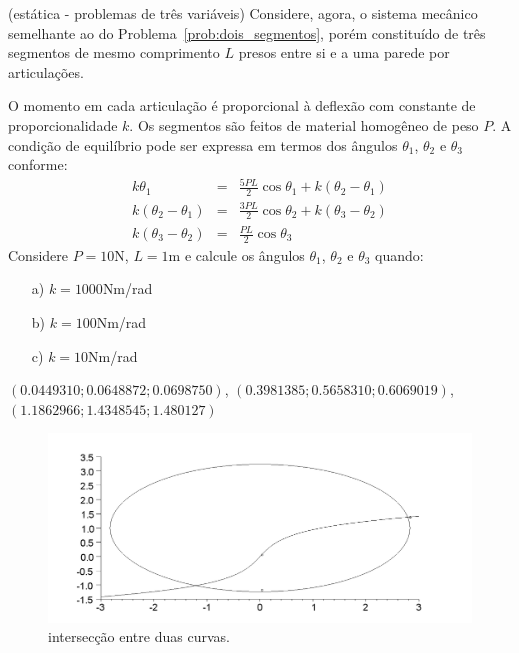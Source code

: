 \begin{exer}{(estática - problemas de três variáveis)} Considere, agora, o sistema mecânico semelhante ao do Problema~\ref{prob:dois_segmentos}, porém constituído de três segmentos de mesmo comprimento $L$ presos entre si e a uma parede por articulações.

O momento em cada articulação é proporcional à deflexão com constante de proporcionalidade $k$. Os segmentos são feitos de material homogêneo de peso $P$. A condição de equilíbrio pode ser expressa em termos dos ângulos $\theta_1$, $\theta_2$ e $\theta_3$ conforme:
\begin{eqnarray*}
k\theta_1&=& \frac{5PL}{2}\cos\theta_1 + k\left(\theta_2-\theta_1\right)\\
k\left(\theta_2-\theta_1\right)&=& \frac{3PL}{2}\cos\theta_2+k\left(\theta_3-\theta_2\right)\\
k\left(\theta_3-\theta_2\right)&=& \frac{PL}{2}\cos\theta_3
\end{eqnarray*}
Considere $P=10$N, $L=1$m e calcule os ângulos $\theta_1$, $\theta_2$ e $\theta_3$ quando:
\begin{itemize}
\item[a)] $k=1000$Nm/rad
\item[b)] $k=100$Nm/rad
\item[c)] $k=10$Nm/rad
\end{itemize}
\end{exer}
\begin{resp}
$\left(0.0449310; 0.0648872; 0.0698750  \right)$, $\left(0.3981385; 0.5658310; 0.6069019  \right)$, \\
$\left(1.1862966;1.4348545;1.480127  \right)$
\end{resp}

\begin{figure}
        \centering
	    \includegraphics[width=.5\textwidth]{cap_nlinsis/pics/inter_curvas}
		\caption{intersecção entre duas curvas.}
		\label{pic:inter_curvas}
	\end{figure}


